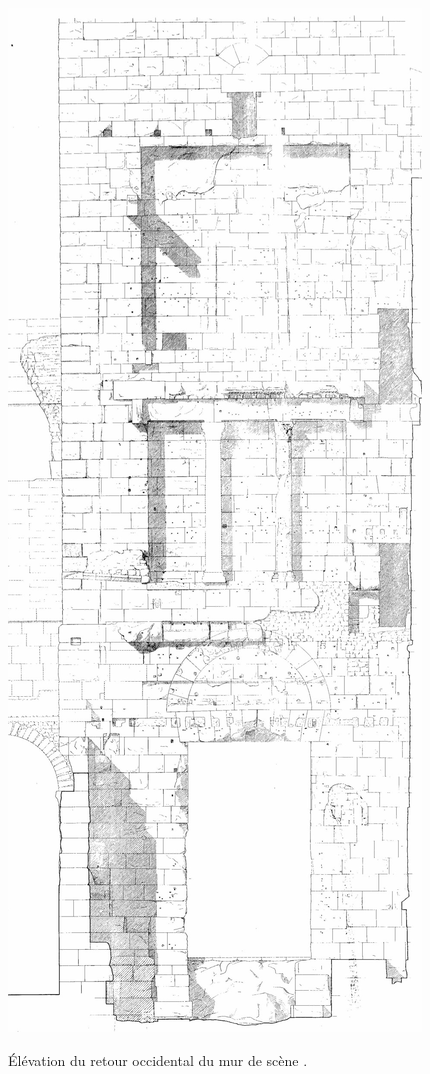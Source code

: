 \begin{figureth}
	\includegraphics[height=0.8\paperheight]{images/retourOccidentalMur}
	\caption[Elévation du retour du mur de scèn.e]{Élévation du retour occidental du mur de scène \cite[Pl. XXVII]{orangePl}.}
	\label{retourmur} 
\end{figureth}

